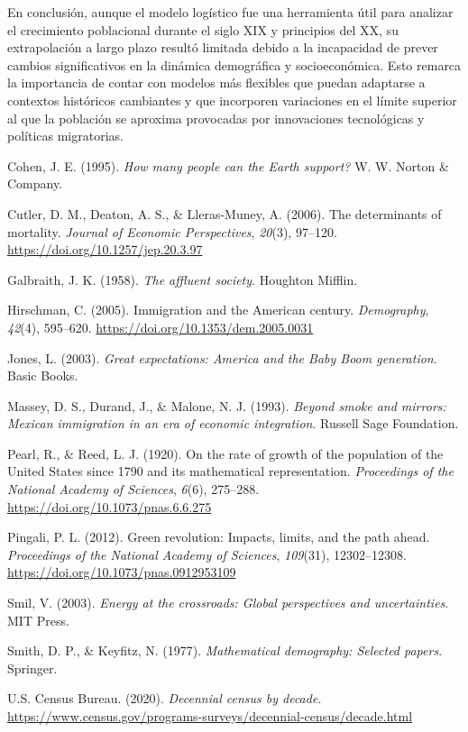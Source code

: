 \documentclass[12pt]{article}
\begin{document}
En conclusión, aunque el modelo logístico fue una herramienta útil para analizar el crecimiento poblacional durante el siglo XIX y principios del XX, su extrapolación a largo plazo resultó limitada debido a la incapacidad de prever cambios significativos en la dinámica demográfica y socioeconómica. Esto remarca la importancia de contar con modelos más flexibles que puedan adaptarse a contextos históricos cambiantes y que incorporen variaciones en el límite superior al que la población se aproxima provocadas por innovaciones tecnológicas y políticas migratorias.


\newpage
\begin{thebibliography}{99}

Cohen, J. E. (1995). \textit{How many people can the Earth support?} W. W. Norton \& Company.

Cutler, D. M., Deaton, A. S., \& Lleras-Muney, A. (2006). The determinants of mortality. \textit{Journal of Economic Perspectives}, \textit{20}(3), 97--120. \url{https://doi.org/10.1257/jep.20.3.97}

Galbraith, J. K. (1958). \textit{The affluent society}. Houghton Mifflin.

Hirschman, C. (2005). Immigration and the American century. \textit{Demography}, \textit{42}(4), 595--620. \url{https://doi.org/10.1353/dem.2005.0031}

Jones, L. (2003). \textit{Great expectations: America and the Baby Boom generation}. Basic Books.

Massey, D. S., Durand, J., \& Malone, N. J. (1993). \textit{Beyond smoke and mirrors: Mexican immigration in an era of economic integration}. Russell Sage Foundation.

Pearl, R., \& Reed, L. J. (1920). On the rate of growth of the population of the United States since 1790 and its mathematical representation. \textit{Proceedings of the National Academy of Sciences}, \textit{6}(6), 275--288. \url{https://doi.org/10.1073/pnas.6.6.275}

Pingali, P. L. (2012). Green revolution: Impacts, limits, and the path ahead. \textit{Proceedings of the National Academy of Sciences}, \textit{109}(31), 12302--12308. \url{https://doi.org/10.1073/pnas.0912953109}

Smil, V. (2003). \textit{Energy at the crossroads: Global perspectives and uncertainties}. MIT Press.

Smith, D. P., \& Keyfitz, N. (1977). \textit{Mathematical demography: Selected papers}. Springer.

U.S. Census Bureau. (2020). \textit{Decennial census by decade}. \url{https://www.census.gov/programs-surveys/decennial-census/decade.html}

\end{thebibliography}
\end{document}
